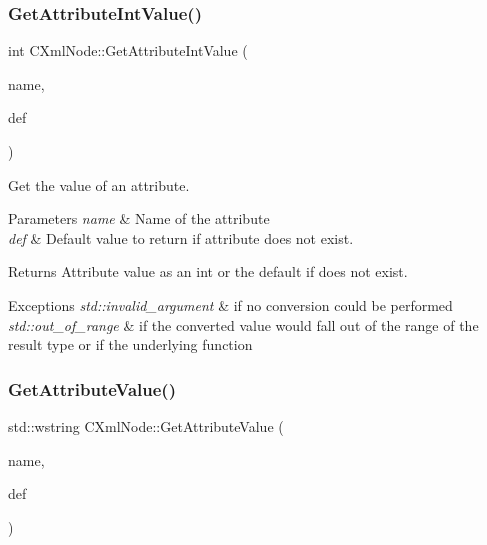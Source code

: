 \subsubsection{\texorpdfstring{GetAttributeIntValue()}{GetAttributeIntValue()}}
{\footnotesize\ttfamily int C\+Xml\+Node\+::\+Get\+Attribute\+Int\+Value (\begin{DoxyParamCaption}\item[{const std\+::wstring \&}]{name,  }\item[{int}]{def }\end{DoxyParamCaption})}



Get the value of an attribute. 


\begin{DoxyParams}{Parameters}
{\em name} & Name of the attribute \\
\hline
{\em def} & Default value to return if attribute does not exist. \\
\hline
\end{DoxyParams}
\begin{DoxyReturn}{Returns}
Attribute value as an int or the default if does not exist. 
\end{DoxyReturn}

\begin{DoxyExceptions}{Exceptions}
{\em std\+::invalid\+\_\+argument} & if no conversion could be performed \\
\hline
{\em std\+::out\+\_\+of\+\_\+range} & if the converted value would fall out of the range of the result type or if the underlying function \\
\hline
\end{DoxyExceptions}
\mbox{\label{classxmlnode_1_1_c_xml_node_ac4b635b102a0ba6c0f64d047fd27f2a1}} 
\subsubsection{\texorpdfstring{GetAttributeValue()}{GetAttributeValue()}}
{\footnotesize\ttfamily std\+::wstring C\+Xml\+Node\+::\+Get\+Attribute\+Value (\begin{DoxyParamCaption}\item[{const std\+::wstring \&}]{name,  }\item[{const std\+::wstring \&}]{def }\end{DoxyParamCaption})}



